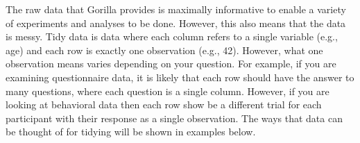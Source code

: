 The raw data that Gorilla provides is maximally informative to enable a variety of experiments and analyses to be done. However, this also means that the data is messy. Tidy data is data where each column refers to a single variable (e.g., age) and each row is exactly one observation (e.g., 42). However, what one observation means varies depending on your question. For example, if you are examining questionnaire data, it is likely that each row should have the answer to many questions, where each question is a single column. However, if you are looking at behavioral data then each row show be a different trial for each participant with their response as a single observation. The ways that data can be thought of for tidying will be shown in examples below.





